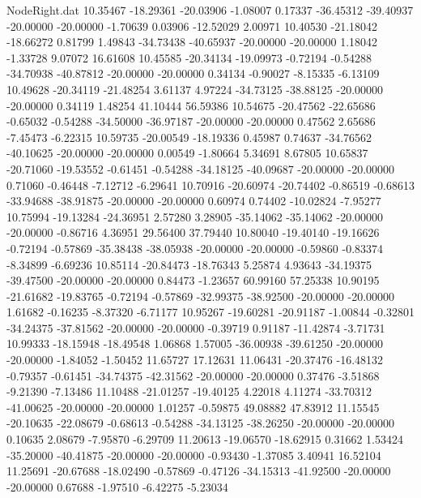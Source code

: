 \begin{filecontents}{NodeRight.dat}
  10.35467  -18.29361  -20.03906    -1.08007    0.17337  -36.45312  -39.40937  -20.00000  -20.00000   -1.70639    0.03906  -12.52029    2.00971
  10.40530  -21.18042  -18.66272     0.81799    1.49843  -34.73438  -40.65937  -20.00000  -20.00000    1.18042   -1.33728    9.07072   16.61608
  10.45585  -20.34134  -19.09973    -0.72194   -0.54288  -34.70938  -40.87812  -20.00000  -20.00000    0.34134   -0.90027   -8.15335   -6.13109
  10.49628  -20.34119  -21.48254     3.61137    4.97224  -34.73125  -38.88125  -20.00000  -20.00000    0.34119    1.48254   41.10444   56.59386
  10.54675  -20.47562  -22.65686    -0.65032   -0.54288  -34.50000  -36.97187  -20.00000  -20.00000    0.47562    2.65686   -7.45473   -6.22315
  10.59735  -20.00549  -18.19336     0.45987    0.74637  -34.76562  -40.10625  -20.00000  -20.00000    0.00549   -1.80664    5.34691    8.67805
  10.65837  -20.71060  -19.53552    -0.61451   -0.54288  -34.18125  -40.09687  -20.00000  -20.00000    0.71060   -0.46448   -7.12712   -6.29641
  10.70916  -20.60974  -20.74402    -0.86519   -0.68613  -33.94688  -38.91875  -20.00000  -20.00000    0.60974    0.74402  -10.02824   -7.95277
  10.75994  -19.13284  -24.36951     2.57280    3.28905  -35.14062  -35.14062  -20.00000  -20.00000   -0.86716    4.36951   29.56400   37.79440
  10.80040  -19.40140  -19.16626    -0.72194   -0.57869  -35.38438  -38.05938  -20.00000  -20.00000   -0.59860   -0.83374   -8.34899   -6.69236
  10.85114  -20.84473  -18.76343     5.25874    4.93643  -34.19375  -39.47500  -20.00000  -20.00000    0.84473   -1.23657   60.99160   57.25338
  10.90195  -21.61682  -19.83765    -0.72194   -0.57869  -32.99375  -38.92500  -20.00000  -20.00000    1.61682   -0.16235   -8.37320   -6.71177
  10.95267  -19.60281  -20.91187    -1.00844   -0.32801  -34.24375  -37.81562  -20.00000  -20.00000   -0.39719    0.91187  -11.42874   -3.71731
  10.99333  -18.15948  -18.49548     1.06868    1.57005  -36.00938  -39.61250  -20.00000  -20.00000   -1.84052   -1.50452   11.65727   17.12631
  11.06431  -20.37476  -16.48132    -0.79357   -0.61451  -34.74375  -42.31562  -20.00000  -20.00000    0.37476   -3.51868   -9.21390   -7.13486
  11.10488  -21.01257  -19.40125     4.22018    4.11274  -33.70312  -41.00625  -20.00000  -20.00000    1.01257   -0.59875   49.08882   47.83912
  11.15545  -20.10635  -22.08679    -0.68613   -0.54288  -34.13125  -38.26250  -20.00000  -20.00000    0.10635    2.08679   -7.95870   -6.29709
  11.20613  -19.06570  -18.62915     0.31662    1.53424  -35.20000  -40.41875  -20.00000  -20.00000   -0.93430   -1.37085    3.40941   16.52104
  11.25691  -20.67688  -18.02490    -0.57869   -0.47126  -34.15313  -41.92500  -20.00000  -20.00000    0.67688   -1.97510   -6.42275   -5.23034

\end{filecontents}
